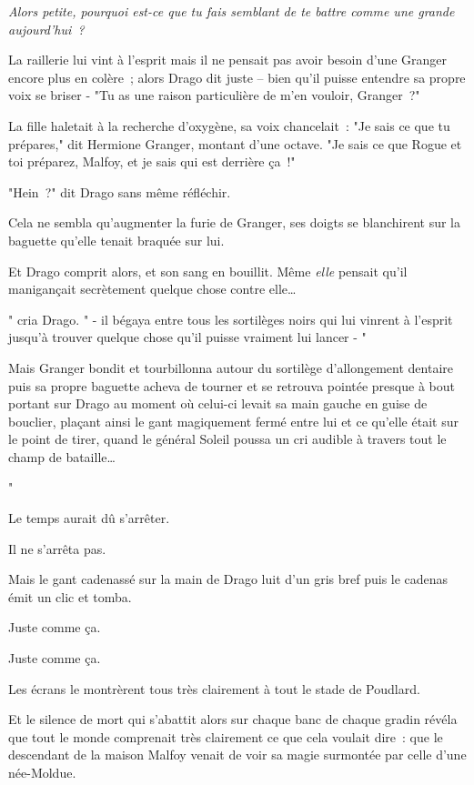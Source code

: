\emph{Alors petite, pourquoi est-ce que tu fais semblant de te battre comme une grande aujourd'hui~?}

La raillerie lui vint à l'esprit mais il ne pensait pas avoir besoin d'une Granger encore plus en colère~; alors Drago dit juste -- bien qu'il puisse entendre sa propre voix se briser - "Tu as une raison particulière de m'en vouloir, Granger~?"

La fille haletait à la recherche d'oxygène, sa voix chancelait~: "Je sais ce que tu prépares," dit Hermione Granger, montant d'une octave. "Je sais ce que Rogue et toi préparez, Malfoy, et je sais qui est derrière ça~!"

"Hein~?" dit Drago sans même réfléchir.

Cela ne sembla qu'augmenter la furie de Granger, ses doigts se blanchirent sur la baguette qu'elle tenait braquée sur lui.

Et Drago comprit alors, et son sang en bouillit. Même \emph{elle} pensait qu'il manigançait secrètement quelque chose contre elle…

" cria Drago. " - il bégaya entre tous les sortilèges noirs qui lui vinrent à l'esprit jusqu'à trouver quelque chose qu'il puisse vraiment lui lancer - "

Mais Granger bondit et tourbillonna autour du sortilège d'allongement dentaire puis sa propre baguette acheva de tourner et se retrouva pointée presque à bout portant sur Drago au moment où celui-ci levait sa main gauche en guise de bouclier, plaçant ainsi le gant magiquement fermé entre lui et ce qu'elle était sur le point de tirer, quand le général Soleil poussa un cri audible à travers tout le champ de bataille…

"

Le temps aurait dû s'arrêter.

Il ne s'arrêta pas.

Mais le gant cadenassé sur la main de Drago luit d'un gris bref puis le cadenas émit un clic et tomba.

Juste comme ça.

Juste comme ça.

Les écrans le montrèrent tous très clairement à tout le stade de Poudlard.

Et le silence de mort qui s'abattit alors sur chaque banc de chaque gradin révéla que tout le monde comprenait très clairement ce que cela voulait dire~: que le descendant de la maison Malfoy venait de voir sa magie surmontée par celle d'une née-Moldue.

